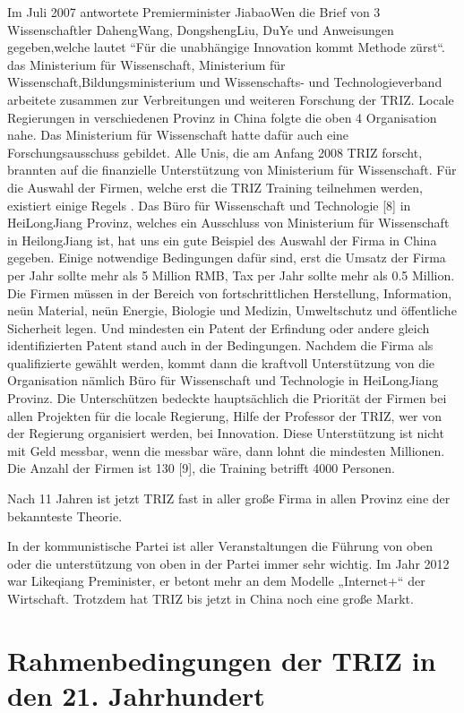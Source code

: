 \documentclass[11pt,a4paper]{article}
\begin{document}
Im Juli 2007 antwortete Premierminister JiabaoWen die Brief von 3
Wissenschaftler DahengWang, DongshengLiu, DuYe und Anweisungen gegeben,welche
lautet “Für die unabhängige Innovation kommt Methode zürst“.  das Ministerium
für Wissenschaft, Ministerium für Wissenschaft,Bildungsministerium und
Wissenschafts- und Technologieverband arbeitete zusammen zur Verbreitungen und
weiteren Forschung der TRIZ. Locale Regierungen in verschiedenen Provinz in
China folgte die oben 4 Organisation nahe. Das Ministerium für Wissenschaft
hatte dafür auch eine Forschungsausschuss gebildet. Alle Unis, die am Anfang
2008 TRIZ forscht, brannten auf die finanzielle Unterstützung von Ministerium
für Wissenschaft. Für die Auswahl der Firmen, welche erst die TRIZ Training
teilnehmen werden, existiert einige Regels . Das Büro für Wissenschaft und
Technologie [8] in HeiLongJiang Provinz, welches ein Ausschluss von Ministerium
für Wissenschaft in HeilongJiang ist, hat uns ein gute Beispiel des Auswahl
der Firma in China gegeben. Einige notwendige Bedingungen dafür sind, erst die
Umsatz der Firma per Jahr sollte mehr als 5 Million RMB, Tax per Jahr sollte
mehr als 0.5 Million. Die Firmen müssen in der Bereich von fortschrittlichen
Herstellung, Information, neün Material, neün Energie, Biologie und Medizin,
Umweltschutz und öffentliche Sicherheit legen. Und mindesten ein Patent der
Erfindung oder andere gleich identifizierten Patent stand auch in der
Bedingungen. Nachdem die Firma als qualifizierte gewählt werden, kommt dann
die kraftvoll Unterstützung von die Organisation nämlich Büro für Wissenschaft
und Technologie in HeiLongJiang Provinz. Die Unterschützen bedeckte
hauptsächlich die Priorität der Firmen bei allen Projekten für die locale
Regierung, Hilfe der Professor der TRIZ, wer von der Regierung organisiert
werden, bei Innovation. Diese Unterstützung ist nicht mit Geld messbar, wenn
die messbar wäre, dann lohnt die mindesten Millionen. Die Anzahl der Firmen
ist 130 [9], die Training betrifft 4000 Personen.

Nach 11 Jahren ist jetzt TRIZ fast in aller große Firma in allen Provinz eine
der bekannteste Theorie.

In der kommunistische Partei ist aller Veranstaltungen die Führung von oben
oder die unterstützung von oben in der Partei immer sehr wichtig. Im Jahr 2012
war Likeqiang Preminister, er betont mehr an dem Modelle „Internet+“ der
Wirtschaft. Trotzdem hat TRIZ bis jetzt in China noch eine große Markt.


\section{Rahmenbedingungen der TRIZ in den 21. Jahrhundert}
\end{document}
